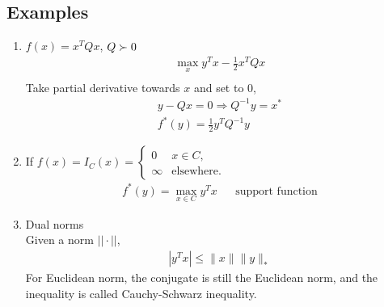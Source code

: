\documentclass[10pt]{article}
\begin{document}
\subsection*{Examples}
\begin{enumerate}
\item $f(x) = x^T Q x$,  $Q \succ 0\\$
\begin{align*}
\max\limits_x y^T x - \frac{1}{2} x^T Q x\\
\end{align*}
Take partial derivative towards $x$ and set to 0,
\begin{align*}
y - Qx = 0 \Longrightarrow Q^{-1} y = x^*\\
f^*(y) = \frac{1}{2} y^T Q^{-1} y
\end{align*}
\item If $f(x) = I_C(x) = \left\{
\begin{array}{ll}
0 &x\in C,\\
\infty &\text{elsewhere.}
\end{array}
\right.$
\begin{align*}
f^*(y) = \max\limits_{x\in C} y^T x &&\text{support function}
\end{align*}
\item Dual norms\\
Given a norm $||\cdot||$,
\begin{align*}
|y^T x| \le \|x\| \|y\|_*
\end{align*}
For Euclidean norm, the conjugate is still the Euclidean norm, and the inequality is called Cauchy-Schwarz inequality.


\end{enumerate}
\end{document}
